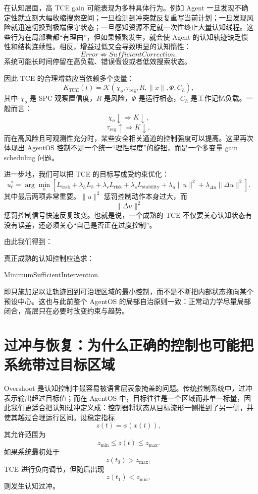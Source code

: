 在认知层面，高 TCE gain 可能表现为多种具体行为。例如 Agent 一旦发现不确定性就立刻大幅收缩搜索空间；一旦检测到冲突就反复重写当前计划；一旦发现风险就迅速切换到极端保守状态；一旦感知资源不足就一次性终止大量认知线程。这些行为在局部看都“有理由”，但如果频繁发生，就会使 Agent 的认知轨迹缺乏惯性和结构连续性。相反，增益过低又会导致明显的认知惰性：
\[
Error
\not\Rightarrow
SufficientCorrection.
\]
系统可能长时间停留在高负载、错误假设或者低效搜索状态。

因此 TCE 的合理增益应当依赖多个变量：
\[
K_{TCE}(t)
=
\mathcal K
\left(
\chi_o,
\tau_{\mathrm{reg}},
R,
\|\dot{x}\|,
\Phi,
C_h
\right),
\]
其中 $\chi_o$ 是 SPC 观察置信度，$R$ 是风险，$\Phi$ 是运行相态，$C_h$ 是工作记忆负载。一般而言：
\[
\chi_o\downarrow
\Rightarrow
K\downarrow,
\]
\[
\tau_{\mathrm{reg}}\uparrow
\Rightarrow
K\downarrow,
\]
而在高风险且可观测性充分时，某些安全相关通道的控制强度可以提高。这里再次体现出 AgentOS 控制不是一个统一“理性程度”的旋钮，而是一个多变量 gain scheduling 问题。

进一步地，我们可以把 TCE 的目标写成受约束优化：
\[
u_t^{*}
=
\arg\min_{u}
\left[
L_{\mathrm{task}}
+
\lambda_h L_h
+
\lambda_r L_{\mathrm{risk}}
+
\lambda_s L_{\mathrm{stability}}
+
\lambda_u \|u\|^2
+
\lambda_{\Delta u}\|\Delta u\|^2
\right].
\]
其中最后两项非常重要。$\|u\|^2$ 惩罚控制动作本身过大，而
\[
\|\Delta u\|^2
\]
惩罚控制信号快速反复改变。也就是说，一个成熟的 TCE 不仅要关心认知状态有没有误差，还必须关心“自己是否正在过度控制”。

由此我们得到：
\begin{statementbox}
\centering
{}
\end{statementbox}
真正成熟的认知控制应追求：
\begin{statementbox}
MinimumSufficientIntervention.
\end{statementbox}
即只施加足以让轨迹回到可治理区域的最小控制，而不是不断把内部状态拖向某个预设中心。这也与此前整个 AgentOS 的局部自治原则一致：正常动力学尽量局部闭合，高层只在必要时改变约束与趋势。

\section{过冲与恢复：为什么正确的控制也可能把系统带过目标区域}

Overshoot 是认知控制中最容易被语言层表象掩盖的问题。传统控制系统中，过冲表示输出超过目标值；而在 AgentOS 中，目标往往是一个区域而非单一标量，因此我们更适合把认知过冲定义成：控制器将状态从目标流形一侧推到了另一侧，并使其越过合理运行区间。设稳定指标
\[
z(t)
=
\phi(x(t)),
\]
其允许范围为
\[
z_{\min}
\le z(t)\le
z_{\max}.
\]
如果系统最初处于
\[
z(t_0)>z_{\max},
\]
TCE 进行负向调节，但随后出现
\[
z(t_1)<z_{\min},
\]
则发生认知过冲。

